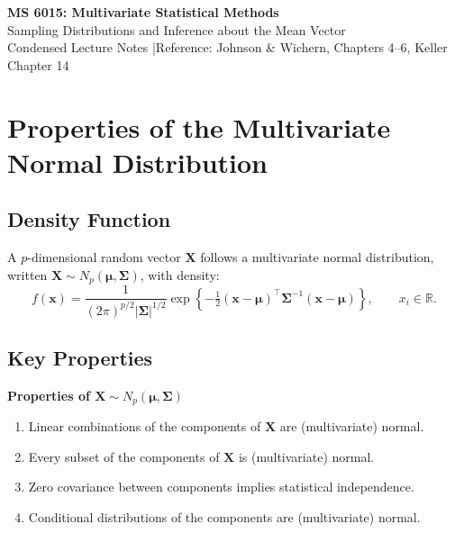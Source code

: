 \documentclass[12pt, a4paper]{article}
\newcommand{\muv}{\boldsymbol{\mu}}
\newcommand{\Sig}{\boldsymbol{\Sigma}}
\newcommand{\Np}{N_p}
\newcommand{\R}{\mathbb{R}}
\begin{document}
\begin{center}
  {\LARGE\bfseries\color{sectionblue} MS 6015: Multivariate Statistical Methods}\\[6pt]
  {\large Sampling Distributions and Inference about the Mean Vector}\\[4pt]
  {\normalsize Condensed Lecture Notes \quad|\quad Reference: Johnson \& Wichern, Chapters 4--6, Keller Chapter 14}
\end{center}

\tableofcontents
\newpage

\section{Properties of the Multivariate Normal Distribution}

\subsection{Density Function}

A $p$-dimensional random vector $\mathbf{X}$ follows a multivariate normal distribution,
written $\mathbf{X} \sim \Np(\muv, \Sig)$, with density:
\[
  f(\mathbf{x}) = \frac{1}{(2\pi)^{p/2}|\Sig|^{1/2}}
  \exp\!\left\{-\tfrac{1}{2}(\mathbf{x}-\muv)^{\top}\Sig^{-1}(\mathbf{x}-\muv)\right\},
  \qquad x_i \in \R.
\]

\subsection{Key Properties}

\begin{keybox}\noindent\textbf{Properties of $\mathbf{X}\sim\Np(\muv,\Sig)$}\par\smallskip
\begin{enumerate}[leftmargin=*, label=\arabic*.]
  \item Linear combinations of the components of $\mathbf{X}$ are (multivariate) normal.
  \item Every subset of the components of $\mathbf{X}$ is (multivariate) normal.
  \item Zero covariance between components implies statistical independence.
  \item Conditional distributions of the components are (multivariate) normal.
\end{enumerate}
\end{keybox}
\end{document}
